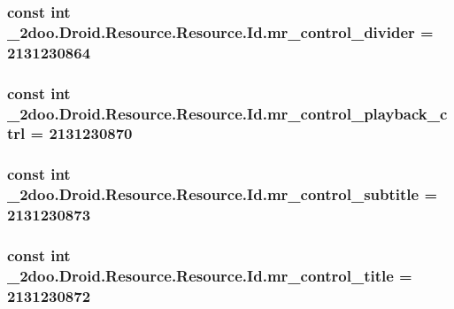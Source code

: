 \hypertarget{class__2doo_1_1_droid_1_1_resource_1_1_id_20674eac0ce82a8a9d9117ffb1a7e9c0}{
\subsubsection[{mr\_\-control\_\-divider}]{\setlength{\rightskip}{0pt plus 5cm}const int \_\-2doo.Droid.Resource.Resource.Id.mr\_\-control\_\-divider = 2131230864}}
\label{class__2doo_1_1_droid_1_1_resource_1_1_id_20674eac0ce82a8a9d9117ffb1a7e9c0}


\hypertarget{class__2doo_1_1_droid_1_1_resource_1_1_id_a111b5a056a6aa3793ec6e5cfc1451b8}{
\subsubsection[{mr\_\-control\_\-playback\_\-ctrl}]{\setlength{\rightskip}{0pt plus 5cm}const int \_\-2doo.Droid.Resource.Resource.Id.mr\_\-control\_\-playback\_\-ctrl = 2131230870}}
\label{class__2doo_1_1_droid_1_1_resource_1_1_id_a111b5a056a6aa3793ec6e5cfc1451b8}


\hypertarget{class__2doo_1_1_droid_1_1_resource_1_1_id_1ca68e9115bf53eef5030c9f1143c13f}{
\subsubsection[{mr\_\-control\_\-subtitle}]{\setlength{\rightskip}{0pt plus 5cm}const int \_\-2doo.Droid.Resource.Resource.Id.mr\_\-control\_\-subtitle = 2131230873}}
\label{class__2doo_1_1_droid_1_1_resource_1_1_id_1ca68e9115bf53eef5030c9f1143c13f}


\hypertarget{class__2doo_1_1_droid_1_1_resource_1_1_id_6bc5690808ad5e175e6aaddc9a5b5f0c}{
\subsubsection[{mr\_\-control\_\-title}]{\setlength{\rightskip}{0pt plus 5cm}const int \_\-2doo.Droid.Resource.Resource.Id.mr\_\-control\_\-title = 2131230872}}
\label{class__2doo_1_1_droid_1_1_resource_1_1_id_6bc5690808ad5e175e6aaddc9a5b5f0c}


